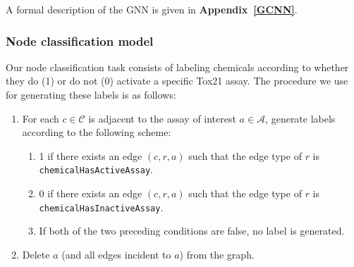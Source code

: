 \documentclass{ws-procs11x85}
\begin{document}
A formal description of the GNN is given in \textbf{Appendix~\ref{GCNN}}.


\subsubsection{Node classification model}\label{methods-nc}
Our node classification task consists of labeling chemicals according to whether they do (1) or do not (0) activate a specific Tox21 assay.
The procedure we use for generating these labels is as follows:
\begin{enumerate}
   \item For each $c \in \mathcal{C}$ is adjacent to the assay of interest $a \in \mathcal{A}$, generate labels according to the following scheme:
   \begin{enumerate}
      \item 1 if there exists an edge $(c, r, a)$ such that the edge type of $r$ is \texttt{chemicalHasActiveAssay}.
      \item 0 if there exists an edge $(c, r, a)$ such that the edge type of $r$ is \texttt{chemicalHasInactiveAssay}.
      \item If both of the two preceding conditions are false, no label is generated.
   \end{enumerate}
   \item Delete $a$ (and all edges incident to $a$) from the graph.
\end{enumerate}
\end{document}
